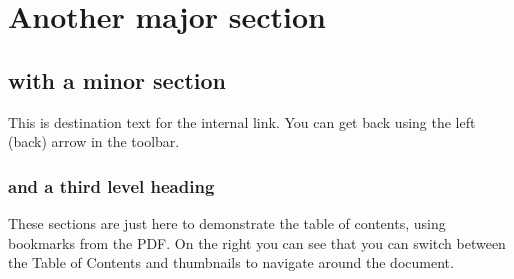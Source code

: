 \documentclass[11pt]{article}
\begin{document}
\section{Another major section}
\subsection{with a minor section}

\label{link-dest}
This is destination text for the internal link. You can get back using the left (back) arrow in the toolbar.

\subsubsection{and a third level heading}

These sections are just here to demonstrate the table of contents, using bookmarks from the PDF.  On the right you can see that you can switch between the Table of Contents and thumbnails to navigate around the document.


                                            
                                             
\end{document}

